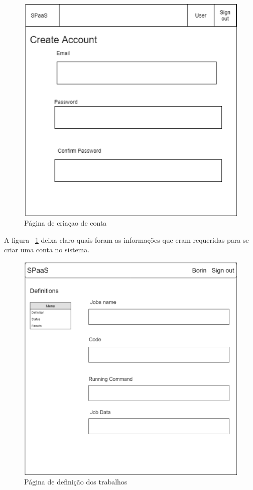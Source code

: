 \documentclass[11pt,twoside]{article}
\begin{document}
\begin{figure}[!h]
  \centering
  \includegraphics[scale=0.4]{account_reg.eps}
  \caption{Página de criaçao de conta}
  \label{fig:createScreen}
\end{figure}

A figura ~\ref{fig:createScreen} deixa claro quais foram as informações que eram requeridas para se criar uma conta no sistema. 

\begin{figure}[!h]
  \centering
  \includegraphics[scale=0.2]{First_screen.eps}
  \caption{Página de definição dos trabalhos}
  \label{fig:definitionScreen}
\end{figure}
\end{document}
